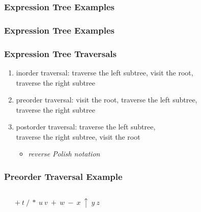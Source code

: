 \documentclass[dvipsnames]{beamer}
\begin{document}
\begin{frame}
  \frametitle{Expression Tree Examples}

  \begin{example}[$((7-a)/5)*((a+b) \uparrow 3)$]
    \begin{center}
    \end{center}
  \end{example}
\end{frame}

\begin{frame}
  \frametitle{Expression Tree Examples}

  \begin{example}[$t+(u*v)/(w+x-y \uparrow z)$]
    \begin{center}
    \end{center}
  \end{example}
\end{frame}

\begin{frame}
  \frametitle{Expression Tree Traversals}

  \begin{enumerate}
    \item \alert{inorder traversal}: traverse the left subtree, visit the root,\\
      traverse the right subtree

    \pause
    \medskip
    \item \alert{preorder traversal}: visit the root, traverse the left subtree,\\
      traverse the right subtree

    \pause
    \medskip
    \item \alert{postorder traversal}: traverse the left subtree,\\
      traverse the right subtree, visit the root
    \begin{itemize}
      \item \emph{reverse Polish notation}
    \end{itemize}
  \end{enumerate}
\end{frame}

\begin{frame}
  \frametitle{Preorder Traversal Example}

  \begin{example}
    \begin{columns}
      \begin{center}
      \end{center}

      \pause
      $+ ~ t ~ / ~ * ~ u ~ v ~ + ~ w ~ - ~ x ~ \uparrow ~ y ~ z$
    \end{columns}
  \end{example}
\end{frame}
\end{document}
